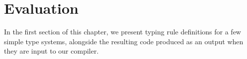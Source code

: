 \documentclass[nofilelist]{cslthse-msc}
\begin{document}
%
%
%

%


\chapter{Evaluation} %
In the first section of this chapter, we present typing rule definitions for a few simple type systems, alongside the resulting code produced as an output when they are input to our compiler.
\end{document}
